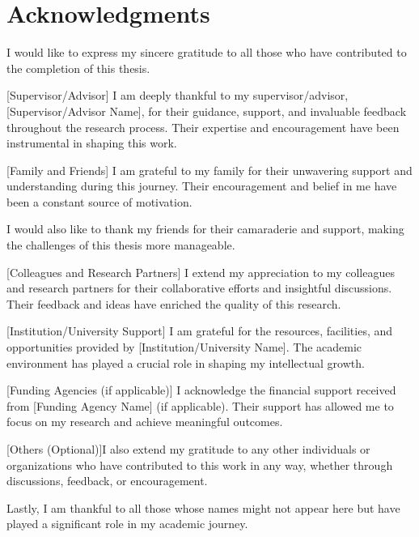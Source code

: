 \chapter*{Acknowledgments}

I would like to express my sincere gratitude to all those who have contributed to the completion of this thesis.

[Supervisor/Advisor] I am deeply thankful to my supervisor/advisor, [Supervisor/Advisor Name], for their guidance, support, and invaluable feedback throughout the research process. Their expertise and encouragement have been instrumental in shaping this work.

[Family and Friends] I am grateful to my family for their unwavering support and understanding during this journey. Their encouragement and belief in me have been a constant source of motivation.

I would also like to thank my friends for their camaraderie and support, making the challenges of this thesis more manageable.

[Colleagues and Research Partners] I extend my appreciation to my colleagues and research partners for their collaborative efforts and insightful discussions. Their feedback and ideas have enriched the quality of this research.

[Institution/University Support] I am grateful for the resources, facilities, and opportunities provided by [Institution/University Name]. The academic environment has played a crucial role in shaping my intellectual growth.

[Funding Agencies (if applicable)] I acknowledge the financial support received from [Funding Agency Name] (if applicable). Their support has allowed me to focus on my research and achieve meaningful outcomes.

[Others (Optional)]I also extend my gratitude to any other individuals or organizations who have contributed to this work in any way, whether through discussions, feedback, or encouragement.

Lastly, I am thankful to all those whose names might not appear here but have played a significant role in my academic journey.

